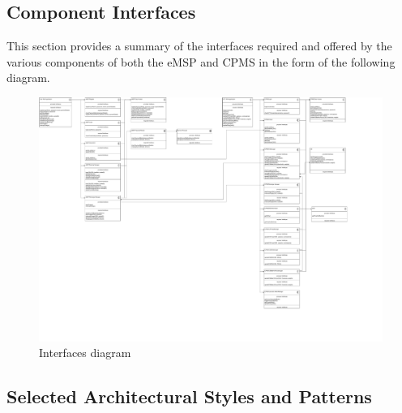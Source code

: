 \documentclass[11pt]{article}
\begin{document}
\newpage

\subsection{Component Interfaces}

This section provides a summary of the interfaces required and offered by the various components of both the eMSP and CPMS in the form of the following diagram.

\begin{figure}[!ht]
    \centerline{
        \includegraphics[page={1}, width=1.18\linewidth, trim=0cm 3.25cm 2cm 0cm, angle=-90, clip]{InterfacesDiagram.pdf}
    }
    \caption{Interfaces diagram}
\end{figure}

\newpage

\subsection{Selected Architectural Styles and Patterns}
\end{document}
